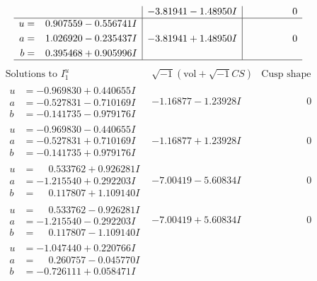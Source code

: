 \documentclass[1p]{elsarticle_modified}
\theoremstyle{definition}
\newcommand{\I}{\sqrt{-1}}
\begin{document}
$$\begin{array}{c|c|c}
 & -3.81941 - 1.48950 I & \phantom{-0.000000 } 0 \\ \hline\begin{aligned}
u &= \phantom{-}0.907559 - 0.556741 I \\
a &= \phantom{-}1.026920 - 0.235437 I \\
b &= \phantom{-}0.395468 + 0.905996 I\end{aligned}
 & -3.81941 + 1.48950 I & \phantom{-0.000000 } 0\\
 \hline 
 \end{array}$$\newpage$$\begin{array}{c|c|c}  
\text{Solutions to }I^u_{1}& \I (\text{vol} + \sqrt{-1}CS) & \text{Cusp shape}\\
 \hline 
\begin{aligned}
u &= -0.969830 + 0.440655 I \\
a &= -0.527831 - 0.710169 I \\
b &= -0.141735 - 0.979176 I\end{aligned}
 & -1.16877 - 1.23928 I & \phantom{-0.000000 } 0 \\ \hline\begin{aligned}
u &= -0.969830 - 0.440655 I \\
a &= -0.527831 + 0.710169 I \\
b &= -0.141735 + 0.979176 I\end{aligned}
 & -1.16877 + 1.23928 I & \phantom{-0.000000 } 0 \\ \hline\begin{aligned}
u &= \phantom{-}0.533762 + 0.926281 I \\
a &= -1.215540 + 0.292203 I \\
b &= \phantom{-}0.117807 + 1.109140 I\end{aligned}
 & -7.00419 - 5.60834 I & \phantom{-0.000000 } 0 \\ \hline\begin{aligned}
u &= \phantom{-}0.533762 - 0.926281 I \\
a &= -1.215540 - 0.292203 I \\
b &= \phantom{-}0.117807 - 1.109140 I\end{aligned}
 & -7.00419 + 5.60834 I & \phantom{-0.000000 } 0 \\ \hline\begin{aligned}
u &= -1.047440 + 0.220766 I \\
a &= \phantom{-}0.260757 - 0.045770 I \\
b &= -0.726111 + 0.058471 I\end{aligned}

\end{array}$$
\end{document}
